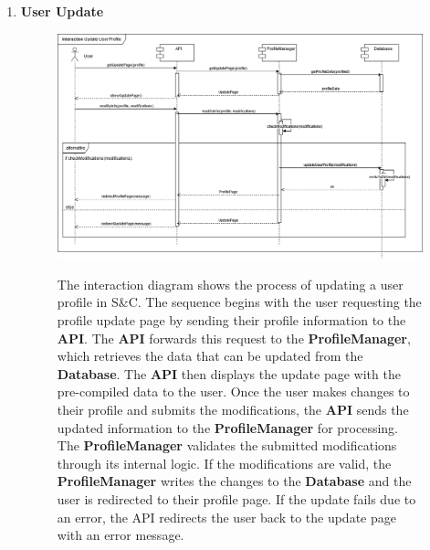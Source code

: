 \begin{enumerate}
    \newpage
    \item \textbf{User Update}
    \begin{figure}[h!]
            \centering  \includegraphics[width=1\textwidth]{DD/Images/Interactions/INT03_UserUpdate.drawio.png}
            \label{fig:ComponentViewDiagram}
            \caption*{The interaction diagram shows the process of updating a user profile in S\&C. The sequence begins with the user requesting the profile update page by sending their profile information to the \textbf{API}. The \textbf{API} forwards this request to the \textbf{ProfileManager}, which retrieves the data that can be updated  from the \textbf{Database}. The \textbf{API} then displays the update page with the pre-compiled data to the user.
            Once the user makes changes to their profile and submits the modifications, the \textbf{API} sends the updated information to the \textbf{ProfileManager} for processing. The \textbf{ProfileManager} validates the submitted modifications through its internal logic. If the modifications are valid, the \textbf{ProfileManager} writes the changes to the \textbf{Database} and the user is redirected to their profile page. If the update fails due to an error, the API redirects the user back to the update page with an error message.}
    \end{figure}


\end{enumerate}
